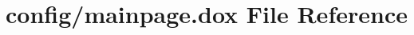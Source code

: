 \hypertarget{mainpage_8dox}{\section{config/mainpage.dox \-File \-Reference}
\label{mainpage_8dox}
}
